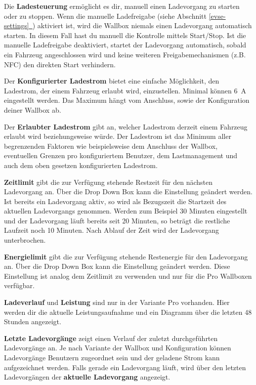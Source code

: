 \documentclass[a4paper,10pt]{article}
\newcommand*{\fullref}[1]{\hyperref[{#1}]{\ref*{#1}~\nameref*{#1}}}
\begin{document}
\begin{multicols*}{2}
	Die \textbf{Ladesteuerung} ermöglicht es dir, manuell einen Ladevorgang zu
	starten oder zu stoppen. Wenn die manuelle Ladefreigabe (siehe Abschnitt \fullref{evse-settings}) aktiviert ist, wird die
	Wallbox niemals einen Ladevorgang automatisch starten. In diesem Fall hast du
	manuell die Kontrolle mittels Start/Stop. Ist die manuelle Ladefreigabe deaktiviert,
	startet der Ladevorgang automatisch, sobald ein Fahrzeug
	angeschlossen wird und keine weiteren Freigabemechanismen (z.B. NFC) den
	direkten Start verhindern.

	Der \textbf{Konfigurierter Ladestrom} bietet eine einfache Möglichkeit, den Ladestrom, der
	einem Fahrzeug erlaubt wird, einzustellen. Minimal können \SI{6}{\ampere} eingestellt werden.
	Das Maximum hängt vom Anschluss, sowie der Konfiguration deiner Wallbox ab.

	Der \textbf{Erlaubter Ladestrom} gibt an, welcher Ladestrom derzeit einem Fahrzeug erlaubt
	wird beziehungsweise würde. Der Ladestrom ist das Minimum aller begrenzenden Faktoren wie
	beispielsweise dem Anschluss der Wallbox, eventuellen Grenzen pro konfiguriertem Benutzer,
	dem Lastmanagement und auch dem oben gesetzen konfigurierten Ladestrom.

	\textbf{Zeitlimit} gibt die zur Verfügung stehende Restzeit für den nächsten
	Ladevorgang an. Über die Drop Down Box kann die Einstellung geändert werden.
	Ist bereits ein Ladevorgang aktiv, so wird als Bezugszeit die Startzeit des
	aktuellen Ladevorgangs genommen. Werden zum Beispiel 30 Minuten eingestellt
	und der Ladevorgang läuft bereits seit 20 Minuten, so beträgt die restliche
	Laufzeit noch 10 Minuten. Nach Ablauf der Zeit wird der Ladevorgang
	unterbrochen.

	\textbf{Energielimit} gibt die zur Verfügung stehende Restenergie für den
	Ladevorgang an. Über die Drop Down Box kann die Einstellung geändert werden.
	Diese Einstellung ist analog dem Zeitlimit zu verwenden und nur für die Pro Wallboxen verfügbar.

	\textbf{Ladeverlauf} und \textbf{Leistung} sind nur in der Variante Pro
	vorhanden. Hier werden dir die aktuelle Leistungsaufnahme und ein Diagramm über
	die letzten 48 Stunden angezeigt.

	\textbf{Letzte Ladevorgänge} zeigt einen Verlauf der zuletzt durchgeführten Ladevorgänge an.
	Je nach Variante der Wallbox und Konfiguration können Ladevorgänge Benutzern zugeordnet sein
	und der geladene Strom kann aufgezeichnet werden. Falls gerade ein Ladevorgang läuft, wird über den letzten Ladevorgängen der \textbf{aktuelle Ladevorgang} angezeigt.


\end{multicols*}
\end{document}
